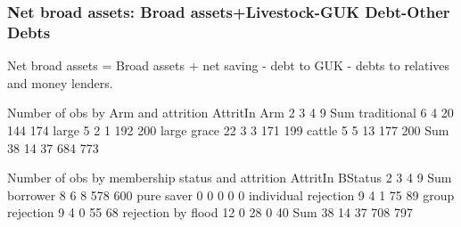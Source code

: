 



\subsubsection{Net broad assets: Broad assets+Livestock-GUK Debt-Other Debts}


Net broad assets = Broad assets + net saving - debt to GUK - debts to relatives and money lenders.

\begin{Schunk}
\begin{Soutput}


Number of obs by Arm and attrition
             AttritIn
Arm             2   3   4   9 Sum
  traditional   6   4  20 144 174
  large         5   2   1 192 200
  large grace  22   3   3 171 199
  cattle        5   5  13 177 200
  Sum          38  14  37 684 773


Number of obs by membership status and attrition
                      AttritIn
BStatus                  2   3   4   9 Sum
  borrower               8   6   8 578 600
  pure saver             0   0   0   0   0
  individual rejection   9   4   1  75  89
  group rejection        9   4   0  55  68
  rejection by flood    12   0  28   0  40
  Sum                   38  14  37 708 797
\end{Soutput}
\end{Schunk}














